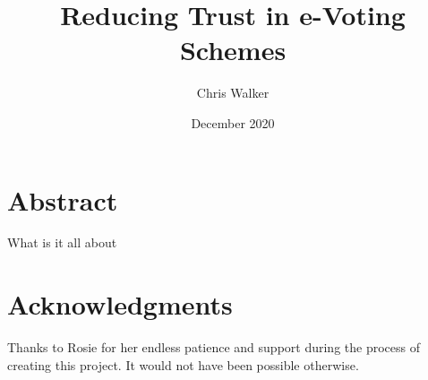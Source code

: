 \documentclass[oneside]{scrbook}
\title{Reducing Trust in e-Voting Schemes}
\author{Chris Walker}
\date{December 2020}
\begin{document}
\maketitle

\frontmatter

\vspace*{\fill}
\section*{Abstract}

What is it all about

\vspace*{1in}
\section*{Acknowledgments}

Thanks to Rosie for her endless patience and support during the process of creating this project. It would not have been possible otherwise.

\vspace*{\fill}

\tableofcontents

\listoffigures
\listoftables


\mainmatter








\end{document}
